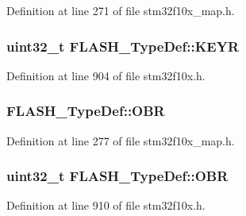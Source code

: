 Definition at line 271 of file stm32f10x\+\_\+map.\+h.

\subsubsection[{\texorpdfstring{K\+E\+YR}{KEYR}}]{ {\bf uint32\+\_\+t} F\+L\+A\+S\+H\+\_\+\+Type\+Def\+::\+K\+E\+YR}\hypertarget{struct_f_l_a_s_h___type_def_a802e9a26a89b44decd2d32d97f729dd3}{}\label{struct_f_l_a_s_h___type_def_a802e9a26a89b44decd2d32d97f729dd3}


Definition at line 904 of file stm32f10x.\+h.

\subsubsection[{\texorpdfstring{O\+BR}{OBR}}]{ F\+L\+A\+S\+H\+\_\+\+Type\+Def\+::\+O\+BR}\hypertarget{struct_f_l_a_s_h___type_def_a159a8918ee3ccfb6e9488c48e37605c0}{}\label{struct_f_l_a_s_h___type_def_a159a8918ee3ccfb6e9488c48e37605c0}


Definition at line 277 of file stm32f10x\+\_\+map.\+h.

\subsubsection[{\texorpdfstring{O\+BR}{OBR}}]{ {\bf uint32\+\_\+t} F\+L\+A\+S\+H\+\_\+\+Type\+Def\+::\+O\+BR}\hypertarget{struct_f_l_a_s_h___type_def_a24dece1e3b3185456afe34c3dc6add2e}{}\label{struct_f_l_a_s_h___type_def_a24dece1e3b3185456afe34c3dc6add2e}


Definition at line 910 of file stm32f10x.\+h.

